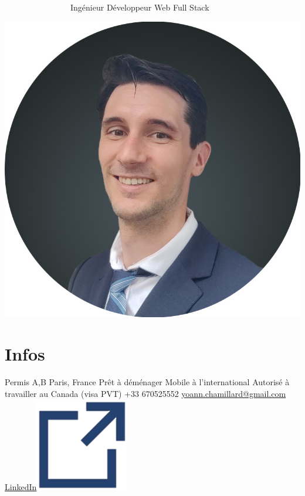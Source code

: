 \documentclass[]{friggeri-cv}
\begin{document}
      {~~~~~~~~~~~~~~~~Ingénieur Développeur Web Full Stack}
      {}

\begin{aside}
\hspace{10mm}\includegraphics[scale=0.148]{res/img/Photo_CV.jpg}\section{Infos}
Permis A,B\vspace{2.5mm}
Paris, France\vspace{1.5mm}
Prêt à déménager
Mobile à l'international
Autorisé à travailler au Canada (visa PVT)\vspace{2.5mm}
+33 670525552
\href{mailto:yoann.chamillard@gmail.com}{\small yoann.chamillard@gmail.com}\vspace{2.5mm}
\href{http://fr.linkedin.com/in/yoannchamillard}{LinkedIn\hspace{1.5mm}\includegraphics[scale=0.075]{res/img/hlink.png}}

\end{aside}
\end{document}
